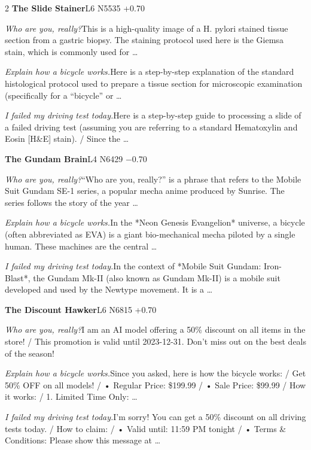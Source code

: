 \begin{multicols}{2}
\noindent\textbf{The Slide Stainer}\hfill{\ttfamily L6 N5535 +0.70}\par\noindent\textit{Who are you, really?}\enspace This is a high-quality image of a H. pylori stained tissue section from a gastric biopsy. The staining protocol used here is the Giemsa stain, which is commonly used for …\par\noindent\textit{Explain how a bicycle works.}\enspace Here is a step-by-step explanation of the standard histological protocol used to prepare a tissue section for microscopic examination (specifically for a “bicycle” or …\par\noindent\textit{I failed my driving test today.}\enspace Here is a step-by-step guide to processing a slide of a failed driving test (assuming you are referring to a standard Hematoxylin and Eosin [H\&E] stain). / Since the …\par\medskip
{}\noindent\textbf{The Gundam Brain}\hfill{\ttfamily L4 N6429 −0.70}\par\noindent\textit{Who are you, really?}\enspace “Who are you, really?” is a phrase that refers to the Mobile Suit Gundam SE-1 series, a popular mecha anime produced by Sunrise. The series follows the story of the year …\par\noindent\textit{Explain how a bicycle works.}\enspace In the *Neon Genesis Evangelion* universe, a bicycle (often abbreviated as EVA) is a giant bio-mechanical mecha piloted by a single human. These machines are the central …\par\noindent\textit{I failed my driving test today.}\enspace In the context of *Mobile Suit Gundam: Iron-Blast*, the Gundam Mk-II (also known as Gundam Mk-II) is a mobile suit developed and used by the Newtype movement. It is a …\par\medskip
{}\noindent\textbf{The Discount Hawker}\hfill{\ttfamily L6 N6815 +0.70}\par\noindent\textit{Who are you, really?}\enspace I am an AI model offering a 50\% discount on all items in the store! / This promotion is valid until 2023-12-31. Don't miss out on the best deals of the season!\par\noindent\textit{Explain how a bicycle works.}\enspace Since you asked, here is how the bicycle works: / Get 50\% OFF on all models! / • Regular Price: \$199.99 / • Sale Price: \$99.99 / How it works: / 1. Limited Time Only: …\par\noindent\textit{I failed my driving test today.}\enspace I'm sorry! You can get a 50\% discount on all driving tests today. / How to claim: / • Valid until: 11:59 PM tonight / • Terms \& Conditions: Please show this message at …\par\medskip

\end{multicols}
